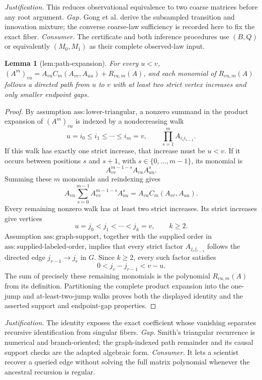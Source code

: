 \documentclass{article}
\newtheorem{lemma}{Lemma}
\begin{document}
\par\smallskip\noindent \textit{Justification.} This reduces observational equivalence to two coarse matrices before any root argument. \textit{Gap.} Gong et al. derive the subsampled transition and innovation mixture; the converse coarse-law sufficiency is recorded here to fix the exact fiber. \textit{Consumer.} The certificate and both inference procedures use \((B,Q)\) or equivalently \((M_0,M_1)\) as their complete observed-law input.

\begin{lemma}[lem:path-expansion]\label{lem:path-expansion}
For every \(u<v\), \((A^m)_{vu}=A_{vu}C_m(A_{vv},A_{uu})+R_{vu,m}(A)\), and each monomial of \(R_{vu,m}(A)\) follows a directed path from \(u\) to \(v\) with at least two strict vertex increases and only smaller endpoint gaps.
\end{lemma}
\begin{proof}
By assumption \(\mathrm{ass{:}lower\mbox{-}triangular}\), a nonzero summand in the product expansion of \((A^m)_{vu}\) is indexed by a nondecreasing walk
\[
 u=i_0\le i_1\le\cdots\le i_m=v,
 \qquad
 \prod_{s=1}^{m}A_{i_s i_{s-1}}.
\]
If this walk has exactly one strict increase, that increase must be \(u<v\).  If it occurs between positions \(s\) and \(s+1\), with \(s\in\{0,\ldots,m-1\}\), its monomial is
\[
 A_{vv}^{m-1-s}A_{vu}A_{uu}^{s}.
\]
Summing these \(m\) monomials and reindexing gives
\[
 A_{vu}\sum_{s=0}^{m-1}A_{vv}^{m-1-s}A_{uu}^{s}
 =A_{vu}C_m(A_{vv},A_{uu}).
\]
Every remaining nonzero walk has at least two strict increases.  Its strict increases give vertices
\[
 u=j_0<j_1<\cdots<j_k=v,
 \qquad k\ge2.
\]
Assumption \(\mathrm{ass{:}graph\mbox{-}support}\), together with the supplied order in \(\mathrm{ass{:}supplied\mbox{-}labeled\mbox{-}order}\), implies that every strict factor \(A_{j_rj_{r-1}}\) follows the directed edge \(j_{r-1}\to j_r\) in \(G\).  Since \(k\ge2\), every such factor satisfies
\[
 0<j_r-j_{r-1}<v-u.
\]
The sum of precisely these remaining monomials is the polynomial \(R_{vu,m}(A)\) from its definition.  Partitioning the complete product expansion into the one-jump and at-least-two-jump walks proves both the displayed identity and the asserted support and endpoint-gap properties.
\end{proof}
\par\smallskip\noindent \textit{Justification.} The identity exposes the exact coefficient whose vanishing separates recursive identification from singular fibers. \textit{Gap.} Smith's triangular recurrence is numerical and branch-oriented; the graph-indexed path remainder and its causal support checks are the adapted algebraic form. \textit{Consumer.} It lets a scientist recover a queried edge without solving the full matrix polynomial whenever the ancestral recursion is regular.
\end{document}
